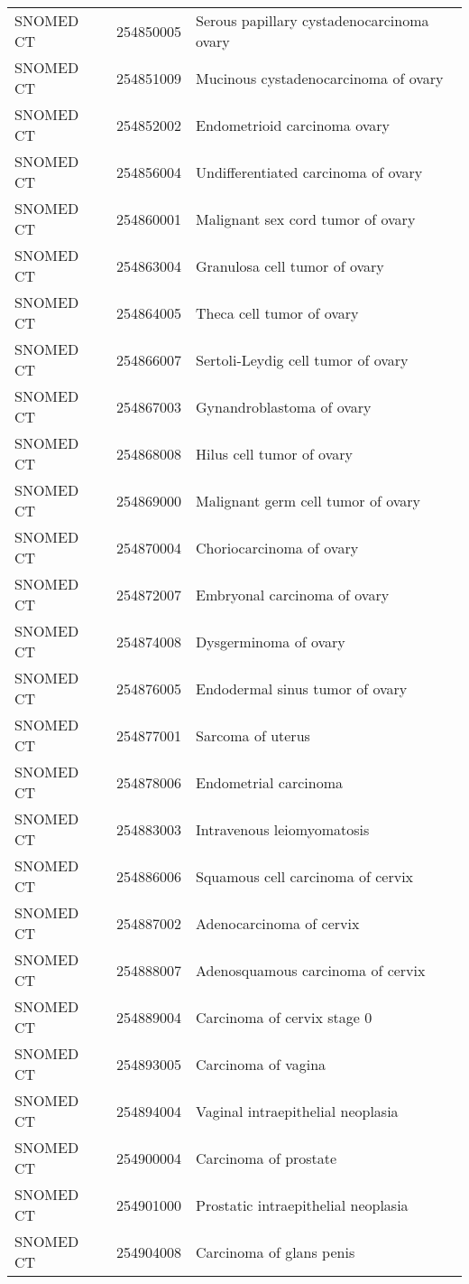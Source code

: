 \begin{longtable}{p{}p{}p{}}
  SNOMED CT & 254850005 & Serous papillary cystadenocarcinoma ovary \\ 
  SNOMED CT & 254851009 & Mucinous cystadenocarcinoma of ovary \\ 
  SNOMED CT & 254852002 & Endometrioid carcinoma ovary \\ 
  SNOMED CT & 254856004 & Undifferentiated carcinoma of ovary \\ 
  SNOMED CT & 254860001 & Malignant sex cord tumor of ovary \\ 
  SNOMED CT & 254863004 & Granulosa cell tumor of ovary \\ 
  SNOMED CT & 254864005 & Theca cell tumor of ovary \\ 
  SNOMED CT & 254866007 & Sertoli-Leydig cell tumor of ovary \\ 
  SNOMED CT & 254867003 & Gynandroblastoma of ovary \\ 
  SNOMED CT & 254868008 & Hilus cell tumor of ovary \\ 
  SNOMED CT & 254869000 & Malignant germ cell tumor of ovary \\ 
  SNOMED CT & 254870004 & Choriocarcinoma of ovary \\ 
  SNOMED CT & 254872007 & Embryonal carcinoma of ovary \\ 
  SNOMED CT & 254874008 & Dysgerminoma of ovary \\ 
  SNOMED CT & 254876005 & Endodermal sinus tumor of ovary \\ 
  SNOMED CT & 254877001 & Sarcoma of uterus \\ 
  SNOMED CT & 254878006 & Endometrial carcinoma \\ 
  SNOMED CT & 254883003 & Intravenous leiomyomatosis \\ 
  SNOMED CT & 254886006 & Squamous cell carcinoma of cervix \\ 
  SNOMED CT & 254887002 & Adenocarcinoma of cervix \\ 
  SNOMED CT & 254888007 & Adenosquamous carcinoma of cervix \\ 
  SNOMED CT & 254889004 & Carcinoma of cervix stage 0 \\ 
  SNOMED CT & 254893005 & Carcinoma of vagina \\ 
  SNOMED CT & 254894004 & Vaginal intraepithelial neoplasia \\ 
  SNOMED CT & 254900004 & Carcinoma of prostate \\ 
  SNOMED CT & 254901000 & Prostatic intraepithelial neoplasia \\ 
  SNOMED CT & 254904008 & Carcinoma of glans penis \\ 

\end{longtable}
